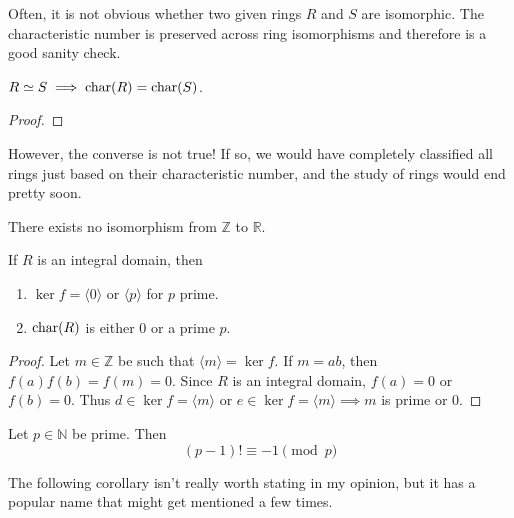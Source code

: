   Often, it is not obvious whether two given rings $R$ and $S$ are isomorphic. The characteristic number is preserved across ring isomorphisms and therefore is a good sanity check. 

  \begin{theorem}
    $R \simeq S \implies \operatorname{char}(R) = \operatorname{char}(S)$. 
  \end{theorem}
  \begin{proof}

  \end{proof}

  However, the converse is not true! If so, we would have completely classified all rings just based on their characteristic number, and the study of rings would end pretty soon. 

  \begin{example}
    There exists no isomorphism from $\mathbb{Z}$ to $\mathbb{R}$. 
  \end{example}

  \begin{corollary}
    If $R$ is an integral domain, then 
    \begin{enumerate}
      \item $\ker{f} = \langle 0 \rangle$ or $\langle p \rangle$ for $p$ prime. 
      \item $\operatorname{char}(R)$ is either $0$ or a prime $p$. 
    \end{enumerate}
  \end{corollary}
  \begin{proof}
    Let $m \in \mathbb{Z}$ be such that $\langle m \rangle = \ker{f}$. If $m = ab$, then $f(a) f(b) = f(m) = 0$. Since $R$ is an integral domain, $f(a) = 0$ or $f(b) = 0$. Thus $d \in \ker{f} = \langle m \rangle$ or $e \in \ker{f} = \langle m \rangle \implies m$ is prime or $0$. 
  \end{proof}

  \begin{theorem}
    Let $p \in \mathbb{N}$ be prime. Then 
    \begin{equation}
      (p-1)! \equiv -1 \pmod{p}
    \end{equation}
  \end{theorem}
  
  The following corollary isn't really worth stating in my opinion, but it has a popular name that might get mentioned a few times. 

